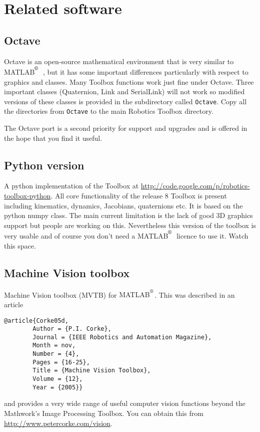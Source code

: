 \documentclass[a4paper]{report}
\def\Mlab{MATLAB$^{\textsuperscript{\textregistered}}$}
\begin{document}
{\section{Related software}

\subsection{Octave}
Octave is an open-source mathematical environment that is very similar to \Mlab\ , but it has some important differences particularly with respect
to graphics and classes.
Many Toolbox functions work just fine under Octave.
Three important classes (Quaternion, Link and SerialLink) will not work so modified versions of these classes is provided in the subdirectory
called \texttt{Octave}.  Copy all the directories from \texttt{Octave} to the main Robotics Toolbox directory.

The Octave port is a second priority for support and upgrades and is offered in the hope that you find it useful. 

\subsection{Python version}
A python implementation of the Toolbox at \url{http://code.google.com/p/robotics-toolbox-python}.
All core functionality of the release 8 Toolbox is present including kinematics, dynamics, Jacobians,
quaternions etc.  It is based on the python numpy class.  The main current limitation is the lack of good 3D graphics support
but people are working on this.  Nevertheless this version of the toolbox is very usable and of course you don't need a \Mlab\ licence
to use it.  Watch this space.

\subsection{Machine Vision toolbox}
Machine Vision toolbox (MVTB) for {\Mlab}.  This was described in an article
\begin{verbatim}
@article{Corke05d,
        Author = {P.I. Corke},
        Journal = {IEEE Robotics and Automation Magazine},
        Month = nov,
        Number = {4},
        Pages = {16-25},
        Title = {Machine Vision Toolbox},
        Volume = {12},
        Year = {2005}}
\end{verbatim}
and provides a very wide range of useful computer vision functions beyond the Mathwork's Image Processing
Toolbox.  You can obtain this from \url{http://www.petercorke.com/vision}.

}
\end{document}
